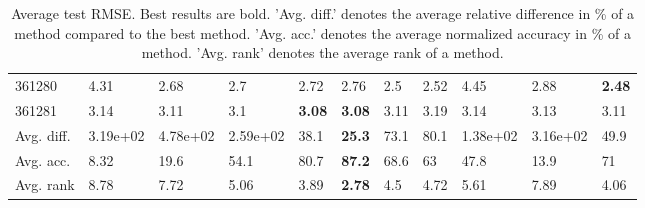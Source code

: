 \begin{table}[ht!]
\begin{tabular}{lllllllllll}
  361280 & 4.31 & 2.68 & 2.7 & 2.72 & 2.76 & 2.5 & 2.52 & 4.45 & 2.88 & \textbf{2.48} \\ 
  361281 & 3.14 & 3.11 & 3.1 & \textbf{3.08} & \textbf{3.08} & 3.11 & 3.19 & 3.14 & 3.13 & 3.11 \\ 
   \hline
Avg. diff. & 3.19e+02 & 4.78e+02 & 2.59e+02 & 38.1 & \textbf{25.3} & 73.1 & 80.1 & 1.38e+02 & 3.16e+02 & 49.9 \\ 
  Avg. acc. & 8.32 & 19.6 & 54.1 & 80.7 & \textbf{87.2} & 68.6 & 63 & 47.8 & 13.9 & 71 \\ 
  Avg. rank & 8.78 & 7.72 & 5.06 & 3.89 & \textbf{2.78} & 4.5 & 4.72 & 5.61 & 7.89 & 4.06 \\ 
   \hline
\hline
\end{tabular}
\endgroup
\caption{Average test RMSE. 
                  Best results are bold. 
                  'Avg. diff.' denotes the average relative difference in \% of a method compared to the best method.
                  'Avg. acc.' denotes the average normalized accuracy in \% of a method.
                  'Avg. rank' denotes the average rank of a method.} 
\label{TABLES/table_results_RMSE_spatial_depth}
\end{table}
